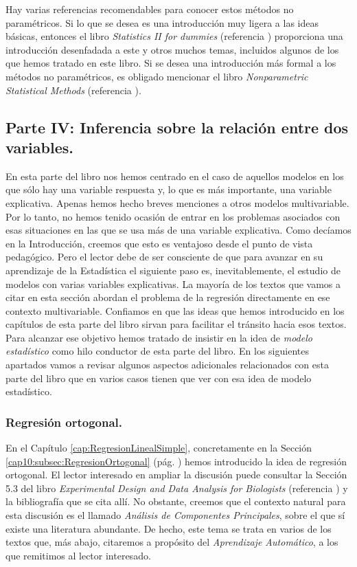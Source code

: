 Hay varias referencias recomendables para conocer estos métodos no paramétricos. Si lo que se desea es una introducción muy ligera a las ideas básicas, entonces el libro {\em Statistics II for dummies} (referencia \cite{rumsey2009statistics}) proporciona una introducción desenfadada a este y otros muchos temas, incluidos algunos de los que hemos tratado en este libro. Si se desea una introducción más formal a los métodos no paramétricos, es obligado mencionar el libro {\em Nonparametric Statistical Methods} (referencia \cite{hollander2013nonparametric}).

\subsection*{Parte IV: Inferencia sobre la relación entre dos variables.}

En esta parte del libro nos hemos centrado en el caso de aquellos modelos en los que sólo hay una variable respuesta y, lo que es más importante, una variable explicativa. Apenas hemos hecho breves menciones a otros modelos multivariable. Por lo tanto, no hemos tenido ocasión de entrar en los problemas asociados con esas situaciones en las que se usa más de una variable explicativa. Como decíamos en la Introducción, creemos que esto es ventajoso desde el punto de vista pedagógico. Pero el lector debe de ser consciente de que para avanzar en su aprendizaje de la Estadística el siguiente paso es, inevitablemente, el estudio de modelos con varias variables explicativas. La mayoría de los textos que vamos a citar en esta sección abordan el problema de la regresión directamente en ese contexto multivariable. Confiamos en que las ideas que hemos introducido en los capítulos de esta parte del libro sirvan para facilitar el tránsito hacia esos textos.  Para alcanzar ese objetivo hemos tratado de insistir en la idea de {\em modelo estadístico} como hilo conductor de esta parte del libro. En los siguientes apartados vamos a revisar algunos aspectos adicionales relacionados con esta parte del libro que en varios casos tienen que ver con esa idea de modelo estadístico.

\subsubsection*{Regresión ortogonal.}

En el Capítulo \ref{cap:RegresionLinealSimple}, concretamente en la Sección \ref{cap10:subsec:RegresionOrtogonal} (pág. \pageref{cap10:subsec:RegresionOrtogonal}) hemos introducido la idea de regresión ortogonal. El lector interesado en ampliar la discusión puede consultar la Sección 5.3 del libro {\em Experimental Design and Data Analysis for Biologists} (referencia \cite{quinn2002experimental}) y la bibliografía que se cita allí. No obstante, creemos que el contexto natural para esta discusión es el llamado {\em Análisis de Componentes Principales}, sobre el que sí existe una literatura abundante. De hecho, este tema se trata en varios de los textos que, más abajo, citaremos a propósito del {\em Aprendizaje Automático}, a los que remitimos al lector interesado.

